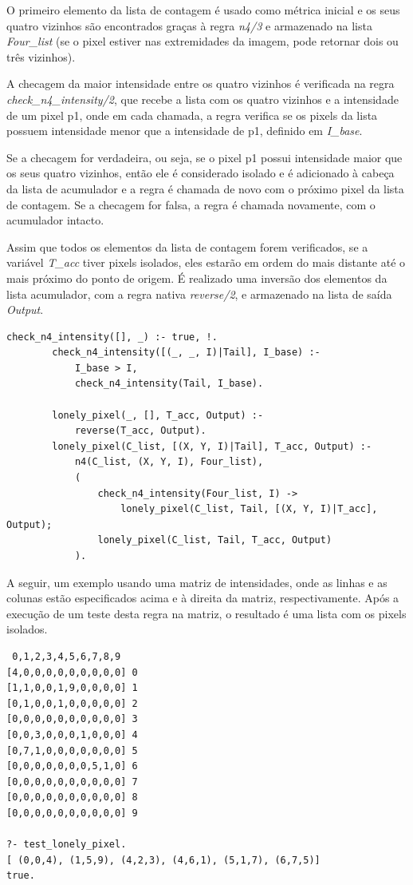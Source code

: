 \documentclass{article}
\begin{document}
        O primeiro elemento da lista de contagem é usado como métrica inicial e os seus quatro vizinhos são encontrados graças à regra \textit{n4/3} e armazenado na lista \textit{Four\_list} (se o pixel estiver nas extremidades da imagem, pode retornar dois ou três vizinhos).
        
        A checagem da maior intensidade entre os quatro vizinhos é verificada na regra \textit{check\_n4\_intensity/2}, que recebe a lista com os quatro vizinhos e a intensidade de um pixel p1, onde em cada chamada, a regra verifica se os pixels da lista possuem intensidade menor que a intensidade de p1, definido em \textit{I\_base}.
        
        Se a checagem for verdadeira, ou seja, se o pixel p1 possui intensidade maior que os seus quatro vizinhos, então ele é considerado isolado e é adicionado à cabeça da lista de acumulador e a regra é chamada de novo com o próximo pixel da lista de contagem. Se a checagem for falsa, a regra é chamada novamente, com o acumulador intacto.

        Assim que todos os elementos da lista de contagem forem verificados, se a variável \textit{T\_acc} tiver pixels isolados, eles estarão em ordem do mais distante até o mais próximo do ponto de origem. É realizado uma inversão dos elementos da lista acumulador, com a regra nativa \textit{reverse/2}, e armazenado na lista de saída \textit{Output}.

        \begin{lstlisting}[frame=single]
        check_n4_intensity([], _) :- true, !.
        check_n4_intensity([(_, _, I)|Tail], I_base) :-
            I_base > I,
            check_n4_intensity(Tail, I_base).

        lonely_pixel(_, [], T_acc, Output) :-
            reverse(T_acc, Output).
        lonely_pixel(C_list, [(X, Y, I)|Tail], T_acc, Output) :-
            n4(C_list, (X, Y, I), Four_list),
            (
                check_n4_intensity(Four_list, I) ->
                    lonely_pixel(C_list, Tail, [(X, Y, I)|T_acc], Output);
                lonely_pixel(C_list, Tail, T_acc, Output)
            ).
        \end{lstlisting}

        A seguir, um exemplo usando uma matriz de intensidades, onde as linhas e as colunas estão especificados acima e à direita da matriz, respectivamente. Após a execução de um teste desta regra na matriz, o resultado é uma lista com os pixels isolados.

        \begin{verbatim}
 0,1,2,3,4,5,6,7,8,9
[4,0,0,0,0,0,0,0,0,0] 0
[1,1,0,0,1,9,0,0,0,0] 1
[0,1,0,0,1,0,0,0,0,0] 2
[0,0,0,0,0,0,0,0,0,0] 3
[0,0,3,0,0,0,1,0,0,0] 4
[0,7,1,0,0,0,0,0,0,0] 5
[0,0,0,0,0,0,0,5,1,0] 6
[0,0,0,0,0,0,0,0,0,0] 7
[0,0,0,0,0,0,0,0,0,0] 8
[0,0,0,0,0,0,0,0,0,0] 9

?- test_lonely_pixel.
[ (0,0,4), (1,5,9), (4,2,3), (4,6,1), (5,1,7), (6,7,5)]
true.

        \end{verbatim}
\end{document}
